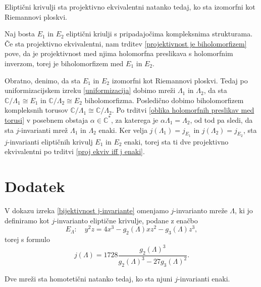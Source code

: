 \documentclass[mat1]{fmfdelo}
\numberwithin{equation}{section}
\newcommand{\C}{\mathbb C}
\newcommand{\CM}{\mathbb C ^*}
\newcommand{\iso}{\cong}
\theoremstyle{definition}
\begin{document}
\begin{posledica}
    Eliptični krivulji sta projektivno ekvivalentni natanko tedaj, ko sta izomorfni kot Riemannovi ploskvi.
\end{posledica}

\begin{dokaz}
    Naj bosta $E_1$ in $E_2$ eliptični kriulji s pripadajočima kompleksnima strukturama. Če sta projektivno ekvivalentni, nam trditev \ref{projektivnost je biholomorfizem} pove, da je projektivnost med njima holomorfna preslikava s holomorfnim inverzom, torej je biholomorfizem med $E_1$ in $E_2$.

    Obratno, denimo, da sta $E_1$ in $E_2$ izomorfni kot Riemannovi ploskvi. Tedaj po uniformizacijskem izreku \ref{uniformizacija} dobimo mreži $\Lambda_1$ in $\Lambda_2$, da sta $\C/\Lambda_1 \iso E_1$ in $\C/\Lambda_2 \iso E_2$ biholomorfizma. Posledično dobimo biholomorfizem kompleksnih torusov $\C/\Lambda_1 \iso \C/\Lambda_2$. Po trditvi \ref{oblika holomorfnih preslikav med torusi} v posebnem obstaja $\alpha \in \CM$, za katerega je $\alpha\Lambda_1 = \Lambda_2$, od tod pa sledi, da sta $j$-invarianti mrež $\Lambda_1$ in $\Lambda_2$ enaki. Ker velja $j(\Lambda_1) = j_{E_1}$ in $j(\Lambda_2) = j_{E_2}$, sta $j$-invarianti eliptičnih krivulj $E_1$ in $E_2$ enaki, torej sta ti dve projektivno ekvivalentni po trditvi \ref{proj ekviv iff j enaki}.
\end{dokaz}


\section{Dodatek}

V dokazu izreka \ref{bijektivnost j-invariante} omenjamo $j$-invarianto mreže $\Lambda$, ki jo definiramo kot $j$-invarianto eliptične krivulje, podane z enačbo
\[
    E_\Lambda: \quad y^2z = 4x^3 - g_2(\Lambda)xz^2 - g_3(\Lambda)z^3,  
\]
torej s formulo
\[
    j(\Lambda) = 1728\frac{g_2(\Lambda)^3}{g_2(\Lambda)^3 - 27g_3(\Lambda)^2}.
\]


\begin{trditev}
    \label{ekvivalentni mrezi -- isti j}
    Dve mreži sta homotetični natanko tedaj, ko sta njuni $j$-invarianti enaki. 
\end{trditev}
\end{document}
